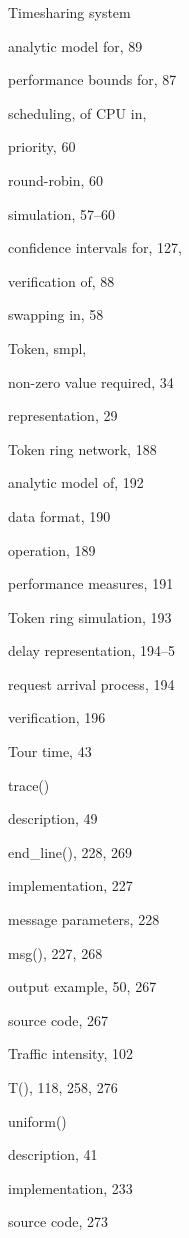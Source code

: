 \noindent Timesharing system\par
\quad analytic model for, 89\par
\quad performance bounds for, 87\par
\quad scheduling, of CPU in,\par
\qquad priority, 60\par
\qquad round-robin, 60\par
\quad simulation, 57--60\par
\qquad confidence intervals for, 127,\par
\qquad verification of, 88\par
\quad swapping in, 58\par
\noindent Token, smpl,\par
\quad non-zero value required, 34\par
\quad representation, 29\par
\noindent Token ring network, 188\par
\quad analytic model of, 192\par
\quad data format, 190\par
\quad operation, 189\par
\quad performance measures, 191\par
\noindent Token ring simulation, 193\par
\quad delay representation, 194--5\par
\quad request arrival process, 194\par
\quad verification, 196\par
\noindent Tour time, 43\par
\noindent trace()\par
\quad description, 49\par
\quad end\_line(), 228, 269\par
\quad implementation, 227\par
\quad message parameters, 228\par
\quad msg(), 227, 268\par
\quad output example, 50, 267\par
\quad source code, 267\par
\noindent Traffic intensity, 102\par
\noindent T(), 118, 258, 276\par
\noindent uniform()\par
\quad description, 41\par
\quad implementation, 233\par
\quad source code, 273\par
